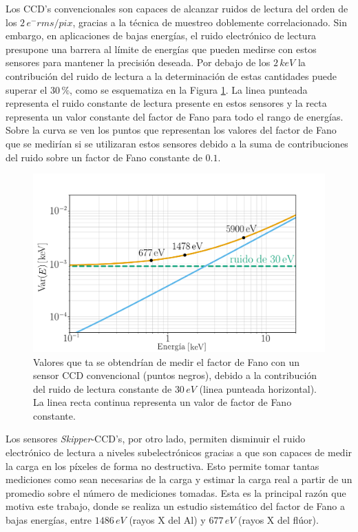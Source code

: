 Los CCD's convencionales son capaces de alcanzar ruidos de lectura del orden de los $2\,e^{-}\si{rms/pix}$, gracias a la técnica de muestreo doblemente correlacionado\cite{Tiffenberg}. Sin embargo, en aplicaciones de bajas energías, el ruido electrónico de lectura presupone una barrera al límite de energías que pueden medirse con estos sensores para mantener la precisión deseada. Por debajo de los $2\,\si{keV}$ la contribución del ruido de lectura a la determinación de estas cantidades puede superar el $30\,\%$, como se esquematiza en la Figura \ref{fig:Fano_y_ruido}. La linea punteada representa el ruido constante de lectura presente en estos sensores y la recta representa un valor constante del factor de Fano para todo el rango de energías. Sobre la curva se ven los puntos que representan los valores del factor de Fano que se medirían si se utilizaran estos sensores debido a la suma de contribuciones del ruido sobre un factor de Fano constante de $0.1$.
\begin{figure}[H]
    \centering
        \includegraphics[scale=0.5]{Figs/fano_y_ruido.pdf}
    \caption{\footnotesize{Valores que ta se obtendrían de medir el factor de Fano con un sensor CCD convencional (puntos negros), debido a la contribución del ruido de lectura constante de $30\,\si{eV}$ (linea punteada horizontal). La linea recta continua representa un valor de factor de Fano constante.}}
    \label{fig:Fano_y_ruido}
\end{figure}
Los sensores \textit{Skipper}-CCD's, por otro lado, permiten disminuir el ruido electrónico de lectura a niveles subelectrónicos gracias a que son capaces de medir la carga en los píxeles de forma no destructiva. Esto permite tomar tantas mediciones como sean necesarias de la carga y estimar la carga real a partir de un promedio sobre el número de mediciones tomadas. Esta es la principal razón que motiva este trabajo, donde se realiza un estudio sistemático del factor de Fano a bajas energías, entre $1486\,\si{eV}$ (rayos X del Al) y $677\,\si{eV}$ (rayos X del flúor).
